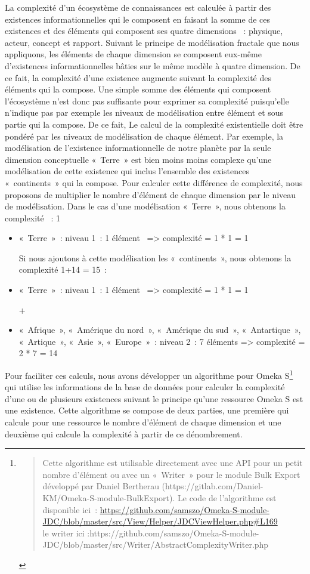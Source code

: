\documentclass[
  letterpaper,
  DIV=11,
  numbers=noendperiod]{scrreprt}
\begin{document}
La complexité d'un écosystème de connaissances est calculée à partir des
existences informationnelles qui le composent en faisant la somme de ces
existences et des éléments qui composent ses quatre dimensions ~:
physique, acteur, concept et rapport. Suivant le principe de
modélisation fractale que nous appliquons, les éléments de chaque
dimension se composent eux-même d'existences informationnelles bâties
sur le même modèle à quatre dimension. De ce fait, la complexité d'une
existence augmente suivant la complexité des éléments qui la compose.
Une simple somme des éléments qui composent l'écosystème n'est donc pas
suffisante pour exprimer sa complexité puisqu'elle n'indique pas par
exemple les niveaux de modélisation entre élément et sous partie qui la
compose. De ce fait, Le calcul de la complexité existentielle doit être
pondéré par les niveaux de modélisation de chaque élément. Par exemple,
la modélisation de l'existence informationnelle de notre planète par la
seule dimension conceptuelle «~Terre~» est bien moins moins complexe
qu'une modélisation de cette existence qui inclus l'ensemble des
existences «~continents~» qui la compose. Pour calculer cette différence
de complexité, nous proposons de multiplier le nombre d'élément de
chaque dimension par le niveau de modélisation. Dans le cas d'une
modélisation «~Terre~», nous obtenons la complexité ~: 1

\begin{itemize}
\item
  «~Terre~»~: niveau 1~: 1 élément~ =\textgreater{} complexité = 1 * 1 =
  1

  Si nous ajoutons à cette modélisation les «~continents~», nous
  obtenons la complexité 1+14 = 15~:
\item
  «~Terre~»~: niveau 1~: 1 élément~ =\textgreater{} complexité = 1 * 1 =
  1

  +
\item
  «~Afrique~», «~Amérique du nord~», «~Amérique du sud~»,
  «~Antartique~», «~Artique~», «~Asie~», «~Europe~»~: niveau 2~: 7
  éléments =\textgreater{} complexité = 2 * 7 = 14
\end{itemize}

Pour faciliter ces calculs, nous avons développer un algorithme pour
Omeka S\footnote{\begin{quote}
  Cette algorithme est utilisable directement avec une API pour un petit
  nombre d'élément ou avec un «~Writer~» pour le module Bulk Export
  développé par Daniel Bertherau
  (https://gitlab.com/Daniel-KM/Omeka-S-module-BulkExport). Le code de
  l'algorithme est disponible ici~:
  \url{https://github.com/samszo/Omeka-S-module-JDC/blob/master/src/View/Helper/JDCViewHelper.php\#L169}\\
  le writer ici
  :https://github.com/samszo/Omeka-S-module-JDC/blob/master/src/Writer/AbstractComplexityWriter.php
  \end{quote}} qui utilise les informations de la base de données pour
calculer la complexité d'une ou de plusieurs existences suivant le
principe qu'une ressource Omeka S est une existence. Cette algorithme se
compose de deux parties, une première qui calcule pour une ressource le
nombre d'élément de chaque dimension et une deuxième qui calcule la
complexité à partir de ce dénombrement.
\end{document}
